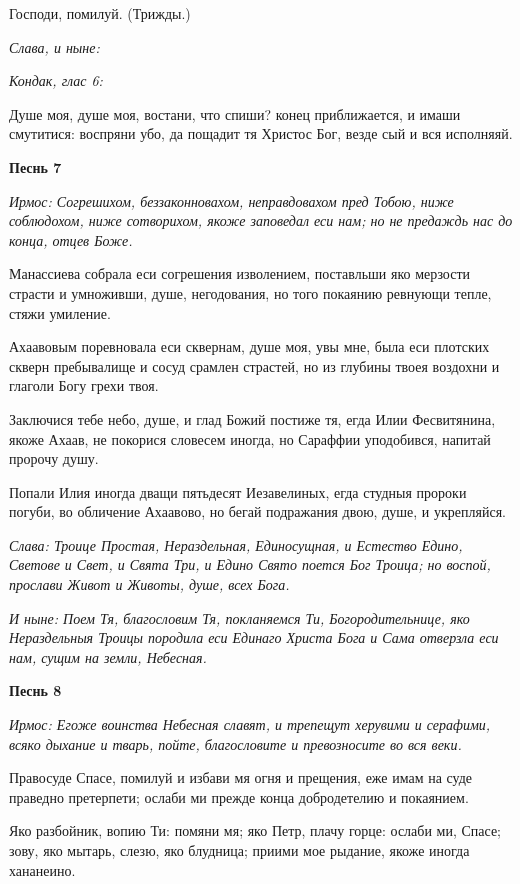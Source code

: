 Господи, помилуй. (Трижды.) 

\itshape Слава, и ныне\normalfont{}: 

\itshape Кондак, глас 6:

\normalfont{}

Душе моя, душе моя, востани, что спиши? конец приближается, и имаши смутитися: воспряни убо, да пощадит тя Христос Бог, везде сый и вся исполняяй. 

\medskip\bfseries Песнь 7\normalfont{}

\itshape Ирмос\normalfont{}: Согрешихом, беззаконновахом, неправдовахом пред Тобою, ниже соблюдохом, ниже сотворихом, якоже заповедал еси нам; но не предаждь нас до конца, отцев Боже. 

Манассиева собрала еси согрешения изволением, поставльши яко мерзости страсти и умноживши, душе, негодования, но того покаянию ревнующи тепле, стяжи умиление. 

Ахаавовым поревновала еси сквернам, душе моя, увы мне, была еси плотских скверн пребывалище и сосуд срамлен страстей, но из глубины твоея воздохни и глаголи Богу грехи твоя. 

Заключися тебе небо, душе, и глад Божий постиже тя, егда Илии Фесвитянина, якоже Ахаав, не покорися словесем иногда, но Сараффии уподобився, напитай пророчу душу. 

Попали Илия иногда дващи пятьдесят Иезавелиных, егда студныя пророки погуби, во обличение Ахаавово, но бегай подражания двою, душе, и укрепляйся. 

\itshape Слава\normalfont{}: Троице Простая, Нераздельная, Единосущная, и Естество Едино, Светове и Свет, и Свята Три, и Едино Свято поется Бог Троица; но воспой, прослави Живот и Животы, душе, всех Бога. 

\itshape И ныне\normalfont{}: Поем Тя, благословим Тя, покланяемся Ти, Богородительнице, яко Нераздельныя Троицы породила еси Единаго Христа Бога и Сама отверзла еси нам, сущим на земли, Небесная. 

\medskip\bfseries Песнь 8\normalfont{}

\itshape Ирмос\normalfont{}: Егоже воинства Небесная славят, и трепещут херувими и серафими, всяко дыхание и тварь, пойте, благословите и превозносите во вся веки. 

Правосуде Спасе, помилуй и избави мя огня и прещения, еже имам на суде праведно претерпети; ослаби ми прежде конца добродетелию и покаянием. 

Яко разбойник, вопию Ти: помяни мя; яко Петр, плачу горце: ослаби ми, Спасе; зову, яко мытарь, слезю, яко блудница; приими мое рыдание, якоже иногда хананеино. 

